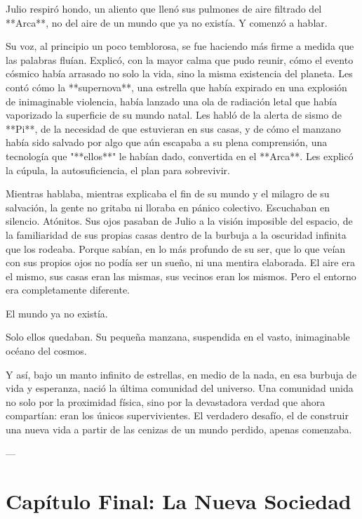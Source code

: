 \documentclass[a4paper,12pt]{book}
\begin{document}
Julio respiró hondo, un aliento que llenó sus pulmones de aire filtrado del **Arca**, no del aire de un mundo que ya no existía. Y comenzó a hablar.

Su voz, al principio un poco temblorosa, se fue haciendo más firme a medida que las palabras fluían. Explicó, con la mayor calma que pudo reunir, cómo el evento cósmico había arrasado no solo la vida, sino la misma existencia del planeta. Les contó cómo la **supernova**, una estrella que había expirado en una explosión de inimaginable violencia, había lanzado una ola de radiación letal que había vaporizado la superficie de su mundo natal. Les habló de la alerta de sismo de **Pi**, de la necesidad de que estuvieran en sus casas, y de cómo el manzano había sido salvado por algo que aún escapaba a su plena comprensión, una tecnología que "**ellos**" le habían dado, convertida en el **Arca**. Les explicó la cúpula, la autosuficiencia, el plan para sobrevivir.

Mientras hablaba, mientras explicaba el fin de su mundo y el milagro de su salvación, la gente no gritaba ni lloraba en pánico colectivo. Escuchaban en silencio. Atónitos. Sus ojos pasaban de Julio a la visión imposible del espacio, de la familiaridad de sus propias casas dentro de la burbuja a la oscuridad infinita que los rodeaba. Porque sabían, en lo más profundo de su ser, que lo que veían con sus propios ojos no podía ser un sueño, ni una mentira elaborada. El aire era el mismo, sus casas eran las mismas, sus vecinos eran los mismos. Pero el entorno era completamente diferente.

El mundo ya no existía.

Solo ellos quedaban. Su pequeña manzana, suspendida en el vasto, inimaginable océano del cosmos.

Y así, bajo un manto infinito de estrellas, en medio de la nada, en esa burbuja de vida y esperanza, nació la última comunidad del universo. Una comunidad unida no solo por la proximidad física, sino por la devastadora verdad que ahora compartían: eran los únicos supervivientes. El verdadero desafío, el de construir una nueva vida a partir de las cenizas de un mundo perdido, apenas comenzaba.

---

\chapter*{Capítulo Final: La Nueva Sociedad}
\end{document}
